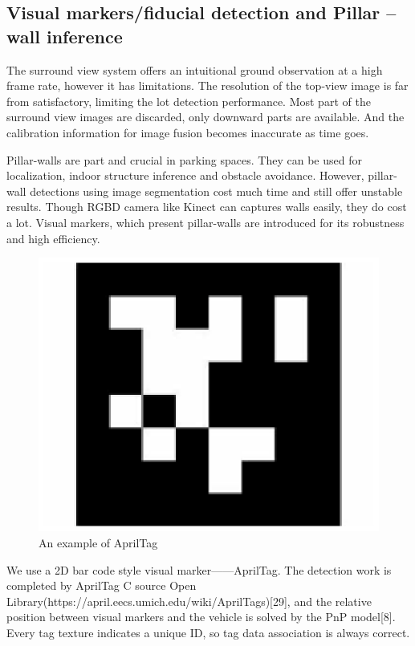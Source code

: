 \documentclass[journal]{IEEEtran}
\begin{document}

\subsection{Visual markers/fiducial detection and Pillar – wall inference }

The surround view system offers an intuitional ground observation at a high frame rate, however it has limitations. The resolution of the top-view image is far from satisfactory, limiting the lot detection performance. Most part of the surround view images are discarded, only downward parts are available. And the calibration information for image fusion becomes inaccurate as time goes.

Pillar-walls are part and crucial in parking spaces. They can be used for localization, indoor structure inference and obstacle avoidance. However, pillar-wall detections using image segmentation cost much time and still offer unstable results. Though RGBD camera like Kinect can captures walls easily, they do cost a lot. Visual markers, which present pillar-walls are introduced for its robustness and high efficiency.


\begin{figure}
\centering
\includegraphics{fig6_Visual_markers}
\caption{An example of AprilTag}\label{fig:6}
\end{figure}

We use a 2D bar code style visual marker——AprilTag. The detection work is completed by AprilTag C source Open Library(https://april.eecs.umich.edu/wiki/AprilTags)[29], and the relative position between visual markers and the vehicle is solved by the PnP model[8]. Every tag texture indicates a unique ID, so tag data association is always correct.
\end{document}
